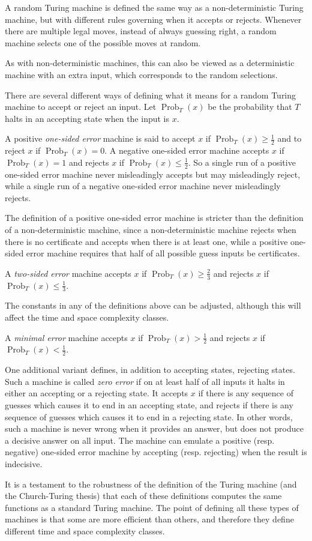 \documentclass[12pt]{article}
\begin{document}
A random Turing machine is defined the same way as a non-deterministic Turing machine, but with different rules governing when it accepts or rejects.  Whenever there are multiple legal moves, instead of always guessing right, a random machine selects one of the possible moves at random.

As with non-deterministic machines, this can also be viewed as a deterministic machine with an extra input, which corresponds to the random selections.

There are several different ways of defining what it means for a random Turing machine to accept or reject an input.  Let $\operatorname{Prob}_T(x)$ be the probability that $T$ halts in an accepting state when the input is $x$.

A positive \emph{one-sided error} machine is said to accept $x$ if $\operatorname{Prob}_T(x)\geq\frac{1}{2}$ and to reject $x$ if $\operatorname{Prob}_T(x)=0$.  A negative one-sided error machine accepts $x$ if $\operatorname{Prob}_T(x)=1$ and rejects $x$ if $\operatorname{Prob}_T(x)\leq\frac{1}{2}$.  So a single run of a positive one-sided error machine never misleadingly accepts but may misleadingly reject, while a single run of a negative one-sided error machine never misleadingly rejects.

The definition of a positive one-sided error machine is stricter than the definition of a non-deterministic machine, since a non-deterministic machine rejects when there is no certificate and accepts when there is at least one, while a positive one-sided error machine requires that half of all possible guess inputs be certificates.

A \emph{two-sided error} machine accepts $x$ if $\operatorname{Prob}_T(x)\geq\frac{2}{3}$ and rejects $x$ if $\operatorname{Prob}_T(x)\leq\frac{1}{3}$.

The constants in any of the definitions above can be adjusted, although this will affect the time and space complexity classes.

A \emph{minimal error} machine accepts $x$ if $\operatorname{Prob}_T(x)>\frac{1}{2}$ and rejects $x$ if $\operatorname{Prob}_T(x)<\frac{1}{2}$.

One additional variant defines, in addition to accepting states, rejecting states.  Such a machine is called \emph{zero error} if on at least half of all inputs it halts in either an accepting or a rejecting state.  It accepts $x$ if there is any sequence of guesses which causes it to end in an accepting state, and rejects if there is any sequence of guesses which causes it to end in a rejecting state.  In other words, such a machine is never wrong when it provides an answer, but does not produce a decisive answer on all input.  The machine can emulate a positive (resp. negative) one-sided error machine by accepting (resp. rejecting) when the result is indecisive.

It is a testament to the robustness of the definition of the Turing machine (and the Church-Turing thesis) that each of these definitions computes the same functions as a standard Turing machine.  The point of defining all these types of machines is that some are more efficient than others, and therefore they define different time and space complexity classes.
\end{document}
